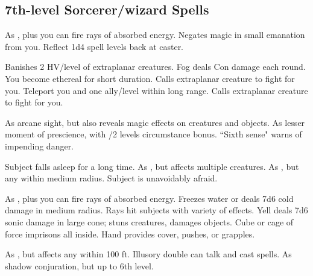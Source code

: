 \subsection{7th-level Sorcerer/wizard Spells}
\begin{swspelllist}
 As , plus you can fire rays of absorbed energy.
\spellhead{}
 Negates magic in small emanation from you.
 Reflect 1d4 spell levels back at caster.

 Banishes 2 HV/level of extraplanar creatures.
 Fog deals Con damage each round.
 You become ethereal for short duration.
 Calls extraplanar creature to fight for you.
 Teleport you and one ally/level within long range.
 Calls extraplanar creature to fight for you.

 As arcane sight, but also reveals magic effects on creatures and objects.
 As lesser moment of prescience, with /2 levels circumstance bonus.
 ``Sixth sense" warns of impending danger.
\spellheadrestricted{}

 Subject falls asleep for a long time.
 As , but affects multiple creatures.
 As , but any within medium radius.
 Subject is unavoidably afraid.

 As , plus you can fire rays of absorbed energy.
 Freezes water or deals 7d6 cold damage in medium radius.
 Rays hit subjects with variety of effects.
 Yell deals 7d6 sonic damage in large cone; stuns creatures, damages objects.
\M Cube or cage of force imprisons all inside.
 Hand provides cover, pushes, or grapples.

 As , but affects any within 100 ft.
 Illusory double can talk and cast spells.
 As shadow conjuration, but up to 6th level.


\end{swspelllist}
